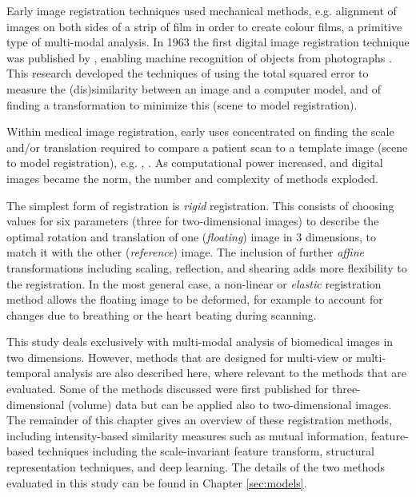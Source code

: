 \documentclass{report}
\begin{document}
Early image registration techniques used mechanical methods, e.g. alignment of images on both sides of a strip of film in order to create colour films, a primitive type of multi-modal analysis. In 1963 the first digital image registration technique was published by \citeauthor{roberts1963machine}, enabling machine recognition of objects from photographs \citep{roberts1963machine}. This research developed the techniques of using the total squared error to measure the (dis)similarity between an image and a computer model, and of finding a transformation to minimize this (scene to model registration).

Within medical image registration, early uses concentrated on finding the scale and/or translation required to compare a patient scan to a template image (scene to model registration), e.g. \cite{barber1976digital}, \cite{appledorn1980automated}. As computational power increased, and digital images became the norm, the number and complexity of methods exploded.


The simplest form of registration is \textit{rigid} registration. This consists of choosing values for six parameters (three for two-dimensional images) to describe the optimal rotation and translation of one (\textit{floating}) image in 3 dimensions, to match it with the other (\textit{reference}) image. The inclusion of further \textit{affine} transformations including scaling, reflection, and shearing adds more flexibility to the registration. In the most general case, a non-linear or \textit{elastic} registration method allows the floating image to be deformed, for example to account for changes due to breathing or the heart beating during scanning.

This study deals exclusively with multi-modal analysis of biomedical images in two dimensions. However, methods that are designed for multi-view or multi-temporal analysis are also described here, where relevant to the methods that are evaluated. Some of the methods discussed were first published for three-dimensional (volume) data but can be applied also to two-dimensional images. The remainder of this chapter gives an overview of these registration methods, including intensity-based similarity measures such as mutual information, feature-based techniques including the scale-invariant feature transform, structural representation techniques, and deep learning. The details of the two methods evaluated in this study can be found in Chapter \ref{sec:models}.
\end{document}

